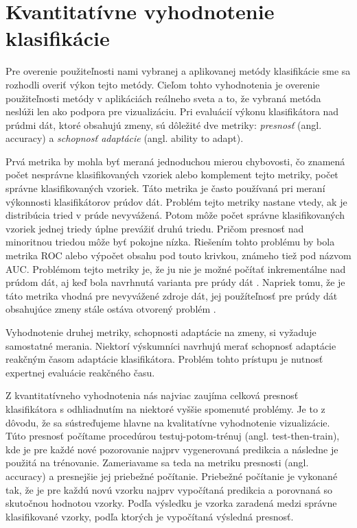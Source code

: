 \section{Kvantitatívne vyhodnotenie klasifikácie}
Pre overenie použiteľnosti nami vybranej a aplikovanej metódy klasifikácie sme sa rozhodli overiť výkon tejto metódy. Cieľom tohto vyhodnotenia je overenie použiteľnosti metódy v aplikáciách reálneho sveta a to, že vybraná metóda neslúži len ako podpora pre vizualizáciu. Pri evaluácií výkonu klasifikátora nad prúdmi dát, ktoré obsahujú zmeny, sú dôležité dve metriky: \textit{presnosť} (angl. accuracy) a \textit{schopnosť adaptácie} (angl. ability to adapt).
\par
Prvá metrika by mohla byť meraná jednoduchou mierou chybovosti, čo znamená počet nesprávne klasifikovaných vzoriek alebo komplement tejto metriky, počet správne klasifikovaných vzoriek. Táto metrika je často používaná pri meraní výkonnosti klasifikátorov prúdov dát. Problém tejto metriky nastane vtedy, ak je distribúcia tried v prúde nevyvážená. Potom môže počet správne klasifikovaných vzoriek jednej triedy úplne prevážiť druhú triedu. Pričom presnosť nad minoritnou triedou môže byť pokojne nízka. Riešením tohto problému by bola metrika ROC alebo výpočet obsahu pod touto krivkou, známeho tiež pod názvom AUC. Problémom tejto metriky je, že ju nie je možné počítať inkrementálne nad prúdom dát, aj keď bola navrhnutá varianta pre prúdy dát \citep{brzezinski2014prequential}. Napriek tomu, že je táto metrika vhodná pre nevyvážené zdroje dát, jej použíteľnosť pre prúdy dát obsahujúce zmeny stále ostáva otvorený problém \citep{brzezinski2014prequential}.
\par
Vyhodnotenie druhej metriky, schopnosti adaptácie na zmeny, si vyžaduje samostatné merania. Niektorí výskumníci navrhujú merať schopnosť adaptácie reakčným časom adaptácie klasifikátora. Problém tohto prístupu je nutnosť expertnej evaluácie reakčného času.
\par
Z kvantitatívneho vyhodnotenia nás najviac zaujíma celková presnosť klasifikátora s odhliadnutím na niektoré vyššie spomenuté problémy. Je to z dôvodu, že sa sústreďujeme hlavne na kvalitatívne vyhodnotenie vizualizácie. Túto presnosť počítame procedúrou testuj-potom-trénuj (angl. test-then-train), kde je pre každé nové pozorovanie najprv vygenerovaná predikcia a následne je použitá na trénovanie. Zameriavame sa teda na metriku presnosti (angl. accuracy) a presnejšie jej priebežné počítanie. Priebežné počítanie je vykonané tak, že je pre každú novú vzorku najprv vypočítaná predikcia a porovnaná so skutočnou hodnotou vzorky. Podľa výsledku je vzorka zaradená medzi správne klasifikované vzorky, podľa ktorých je vypočítaná výsledná presnosť.

